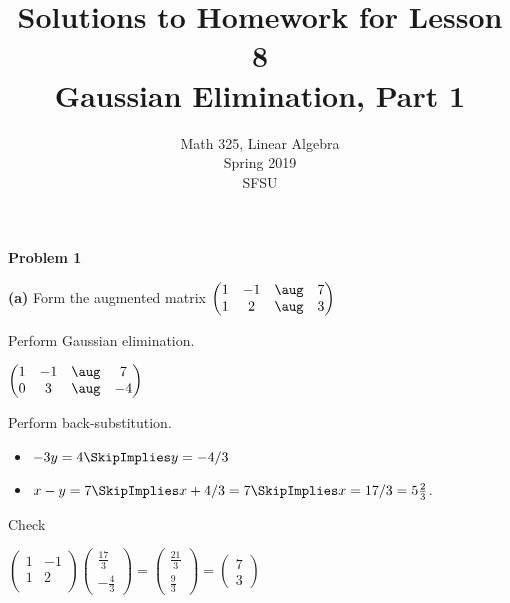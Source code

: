 \documentclass[oneside,12pt]{amsart}
\begin{document}
\title{Solutions to Homework for Lesson 8 \\ Gaussian Elimination, Part 1}
\author{Math 325, Linear Algebra \\ Spring 2019\\ SFSU }
\date{}

\maketitle


\textbf{Problem 1}

\bigskip


\textbf{(a)} Form the augmented matrix
$
\begin{pmatrix}
 1 & -1 &  \aug & 7  \\
 1 &  2 &  \aug & 3  \\
\end{pmatrix}
$

Perform Gaussian elimination.


\bigskip

$
\begin{pmatrix}
 1 & -1 &  \aug & 7  \\
 0 &  3 &  \aug & -4  \\
\end{pmatrix}
$


\bigskip

Perform back-substitution.

\begin{itemize}
\item $-3y = 4  \SkipImplies y = -4/3$
\item $x-y=7 \SkipImplies x+4/3=7 \SkipImplies x = 17/3 = 5 \frac{2}{3}$.
\end{itemize}

\bigskip

Check

\bigskip

$
\begin{pmatrix}
 1 & -1 \\
 1 & 2 \\
\end{pmatrix}
\begin{pmatrix}
 \frac{17}{3} \\[6pt]
 -\frac{4}{3}
\end{pmatrix}
=
\begin{pmatrix}
 \frac{21}{3} \\[6pt]
 \frac{9}{3}
\end{pmatrix}
=
\begin{pmatrix}
 7 \\
3
\end{pmatrix}
$
\end{document}
